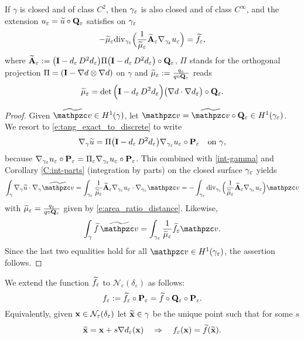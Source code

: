 \begin{lemma}\label{L:PDE-ue}
If $\gamma$ is closed and of class $C^2$, then $\gae$ is also closed and of class
$C^\infty$, and the extension $\ue = \wu\circ\bQe$ satisfies on $\gae$
%
\[  
- \wmue \mathrm{div}_\gae \Big(\frac{1}{\wmue} \wbAe \nabla_\gae \ue \Big) = \wfe,
\]
%
where $\wbAe := \big(\bI - \wde \, D^2\wde \big) \Pi
\big(\bI - \wde \, D^2\wde \big)\circ\bQe$,
$\Pi$ stands for the orthogonal  projection $\Pi = (\bI - \nabla d\otimes\nabla d)$
on $\gamma$ and $\wmue := \frac{\qe}{q\circ\bQe}$ reads
%
\[
\wmue = \det\Big(\bI - \wde \, D^2\wde  \Big)
\big( \nabla d \cdot \nabla\wde  \big) \circ\bQe.
\]
%
\end{lemma}
%
\begin{proof}
Given $\wv\in H^1(\gamma)$, let $\tv = \ttv\circ\bQe \in H^1(\gae)$.
We resort to \eqref{e:tang_exact_to_discrete} to write
%
\[
\nabla_\gamma \wu = \Pi \big(\bI - \wde \, D^2 \wde  \big)
\nabla_\gae \ue \circ \bPe \quad\textrm{on }\gamma,
\]
%
because $\nabla_\gae \ue \circ \bPe = \Pi_\varepsilon \nabla_\gae \ue \circ \bPe$.
This combined with \eqref{int-gamma} and Corollary \ref{C:int-parts}
(integration by parts) on the closed surface $\gae$ yields
%
\[
\int_\gamma \nabla_\gamma \wu \cdot \nabla_\gamma \ttv
= \int_\gae \frac{1}{\wmue} \wbAe \nabla_\gae \ue \cdot \nabla_\gae \tv
= -  \int_\gae \mathrm{div}_\gae \Big( \frac{1}{\wmue} \wbAe \nabla_\gae \ue \Big) \tv
\]
%
with $\wmue=\frac{\qe}{q\circ\bQe}$ given by \eqref{e:area_ratio_distance}.
Likewise,
%
\[
\int_\gamma \wf \, \ttv = \int_\gae \frac{1}{\wmue}\wfe \tv .
\]
%
Since the last two equalities hold for all $\tv\in H^1(\gae)$, the assertion
follows.
\end{proof}
  

We extend the function $\wfe$ to ${\mathcal{N}}_\varepsilon({\delta_\varepsilon})$ as follows:
%
\[
\fe := \wfe \circ \bPe = \wf \circ \bQe \circ \bPe.
\]
%
Equivalently, given $\bx\in{\mathcal{N}}_\varepsilon({\delta_\varepsilon})$
let $\wx\in\gamma$ be the unique point such that for some $s$
%
\[
\wx = \bx + s \nabla\wde(\bx)
\quad\Rightarrow\quad
\fe(\bx) = \wf(\wx).
\]

